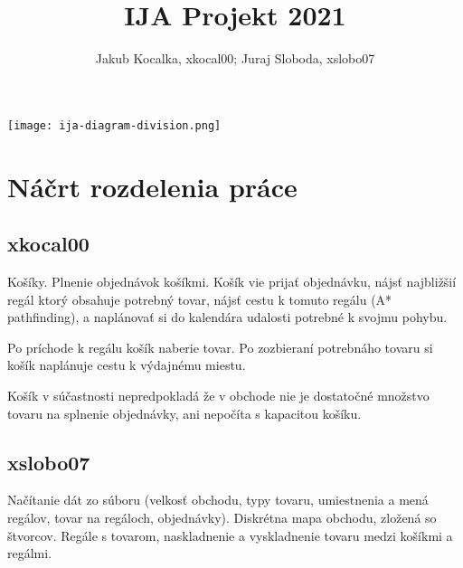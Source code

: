 \documentclass[10pt,a4paper]{article}
\author{Jakub Kocalka, xkocal00; Juraj Sloboda, xslobo07}
\title{IJA Projekt 2021}
\begin{document}
	\maketitle
	
	\begin{sidewaysfigure}[ht]
		\texttt{[image: ija-diagram-division.png]}
	\end{sidewaysfigure}


	\section{Náčrt rozdelenia práce}
	\subsection{xkocal00}
	Košíky. Plnenie objednávok košíkmi. Košík vie prijať objednávku, nájsť najbližšií regál ktorý obsahuje potrebný tovar, nájsť cestu k tomuto regálu (A* pathfinding), a naplánovať si do kalendára udalosti potrebné k svojmu pohybu.
	
	Po príchode k regálu košík naberie tovar. Po zozbieraní potrebnáho tovaru si košík naplánuje cestu k výdajnému miestu.
	
	Košík v súčastnosti nepredpokladá že v obchode nie je dostatočné množstvo tovaru na splnenie objednávky, ani nepočíta s kapacitou košíku.
	
	\subsection{xslobo07} 
	Načítanie dát zo súboru (velkosť obchodu, typy tovaru, umiestnenia a mená regálov, tovar na regáloch, objednávky). Diskrétna mapa obchodu, zložená so štvorcov. Regále s tovarom, naskladnenie a vyskladnenie tovaru medzi košíkmi a regálmi.
	
\end{document}

